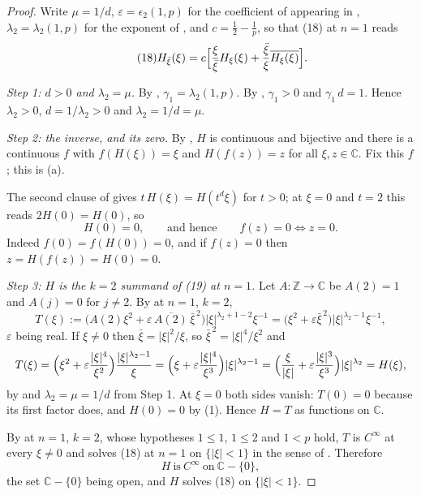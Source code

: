 \begin{proof}
Write $\mu=1/d$, $\varepsilon=\epsilon_2(1,p)$ for the coefficient of
 appearing in , $\lambda_2=\lambda_2(1,p)$
for the exponent of , and
$c=\tfrac12-\tfrac1p$, so that (18) at $n=1$ reads
\begin{equation}\tag{18}
  H_{\bar\xi}(\xi)=c\Bigl[\frac{\xi}{\bar\xi}H_\xi(\xi)
    +\frac{\bar\xi}{\xi}\overline{H_\xi(\xi)}\Bigr].
\end{equation}

\emph{Step 1: $d>0$ and $\lambda_2=\mu$.}  By ,
$\gamma_1=\lambda_2(1,p)$.  By , $\gamma_1>0$ and
$\gamma_1\,d=1$.  Hence $\lambda_2>0$, $d=1/\lambda_2>0$ and
$\lambda_2=1/d=\mu$.

\emph{Step 2: the inverse, and its zero.}  By , $H$
is continuous and bijective and there is a continuous $f$ with
$f(H(\xi))=\xi$ and $H(f(z))=z$ for all $\xi,z\in\mathbb{C}$.  Fix this $f$;
this is (a).

The second clause of  gives
$t\,H(\xi)=H(t^{d}\xi)$ for $t>0$; at $\xi=0$ and $t=2$ this reads
$2H(0)=H(0)$, so
\begin{equation}\tag{1}
  H(0)=0,\qquad\text{and hence}\qquad
  f(z)=0\iff z=0 .
\end{equation}
Indeed $f(0)=f(H(0))=0$, and if $f(z)=0$ then $z=H(f(z))=H(0)=0$.

\emph{Step 3: $H$ is the $k=2$ summand of (19) at $n=1$.}  Let
$A\colon\mathbb{Z}\to\mathbb{C}$ be $A(2)=1$ and $A(j)=0$ for $j\neq2$.  By
 at $n=1$, $k=2$,
\[
  T(\xi):=\bigl(A(2)\xi^{2}+\varepsilon\,\overline{A(2)}\,\bar\xi^{\,2}\bigr)
    |\xi|^{\lambda_2+1-2}\xi^{-1}
  =\bigl(\xi^{2}+\varepsilon\bar\xi^{\,2}\bigr)|\xi|^{\lambda_2-1}\xi^{-1},
\]
$\varepsilon$ being real.  If $\xi\neq0$ then $\bar\xi=|\xi|^{2}/\xi$, so
$\bar\xi^{\,2}=|\xi|^{4}/\xi^{2}$ and
\[
  T(\xi)=\Bigl(\xi^{2}+\varepsilon\frac{|\xi|^{4}}{\xi^{2}}\Bigr)
    \frac{|\xi|^{\lambda_2-1}}{\xi}
  =\Bigl(\xi+\varepsilon\frac{|\xi|^{4}}{\xi^{3}}\Bigr)|\xi|^{\lambda_2-1}
  =\Bigl(\frac{\xi}{|\xi|}+\varepsilon\frac{|\xi|^{3}}{\xi^{3}}\Bigr)
    |\xi|^{\lambda_2}
  =H(\xi),
\]
by  and $\lambda_2=\mu=1/d$ from Step 1.  At $\xi=0$ both
sides vanish: $T(0)=0$ because its first factor does, and $H(0)=0$ by (1).
Hence $H=T$ as functions on $\mathbb{C}$.

By  at $n=1$, $k=2$, whose hypotheses $1\le1$,
$1\le2$ and $1<p$ hold, $T$ is $C^\infty$ at every $\xi\neq0$ and solves (18)
at $n=1$ on $\{|\xi|<1\}$ in the sense of .  Therefore
\begin{equation}\tag{2}
  H\ \text{is}\ C^\infty\ \text{on}\ \mathbb{C}-\{0\},
\end{equation}
the set $\mathbb{C}-\{0\}$ being open, and $H$ solves (18) on $\{|\xi|<1\}$.


\end{proof}
